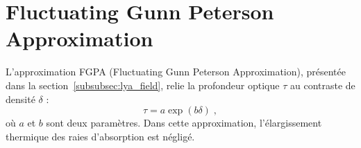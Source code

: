 % 


% 

\chapter{Fluctuating Gunn Peterson Approximation}
\label{app:fgpa}

L'approximation FGPA (Fluctuating Gunn Peterson Approximation), présentée dans la section~\ref{subsubsec:lya_field}, relie la profondeur optique $\tau$ au contraste de densité $\delta$ :
\begin{equation}
  \tau = a \exp(b \delta) \; ,
\end{equation}
où $a$ et $b$ sont deux paramètres.
Dans cette approximation, l'élargissement thermique des raies d'absorption est négligé.

